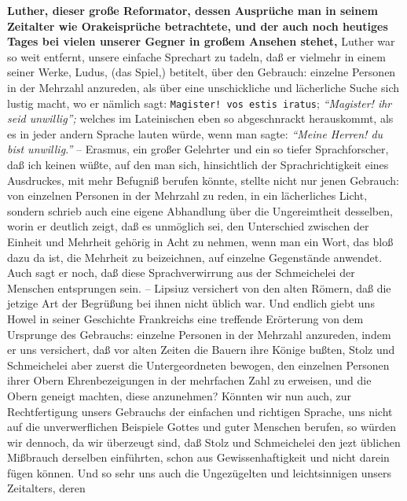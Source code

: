 \textbf{Luther, dieser große Reformator, dessen Ausprüche man in seinem Zeitalter
wie Orakeisprüche betrachtete, und der auch noch heutiges Tages bei vielen
unserer Gegner in großem Ansehen stehet,} Luther war so weit entfernt, unsere
einfache Sprechart zu tadeln, daß er vielmehr in einem seiner Werke, Ludus, (das
Spiel,) betitelt, über den Gebrauch: einzelne Personen in der Mehrzahl
anzureden, als über eine unschickliche und lächerliche Suche sich lustig macht,
wo er nämlich sagt: \texttt{Magister! vos estis iratus}; \textit{"`Magister! ihr seid
unwillig"';} welches im Lateinischen eben so abgeschnrackt herauskommt, als es in
jeder andern Sprache lauten würde, wenn man sagte:
\textit{"`Meine Herren! du bist unwillig."'} -- Erasmus, ein großer Gelehrter und ein so tiefer Sprachforscher,
daß ich keinen wüßte, auf den man sich, hinsichtlich der Sprachrichtigkeit eines
Ausdruckes, mit mehr Befugniß berufen könnte, stellte nicht nur jenen Gebrauch:
von einzelnen Personen in der Mehrzahl zu reden, in ein lächerliches Licht,
sondern schrieb auch eine eigene Abhandlung über die Ungereimtheit desselben,
worin er deutlich zeigt, daß es unmöglich sei, den Unterschied zwischen der
Einheit und Mehrheit gehörig in Acht zu nehmen, wenn man ein Wort, das bloß dazu
da ist, die Mehrheit zu beizeichnen, auf einzelne Gegenstände anwendet. Auch
sagt er noch, daß diese Sprachverwirrung aus der Schmeichelei der Menschen
entsprungen sein. -- Lipsiuz versichert von den alten Römern, daß die jetzige Art
der Begrüßung bei ihnen nicht üblich war. Und endlich giebt uns Howel in seiner
Geschichte Frankreichs eine treffende Erörterung von dem Ursprunge des
Gebrauchs: einzelne Personen in der Mehrzahl anzureden, indem er uns versichert,
daß vor alten Zeiten die Bauern ihre Könige bußten, Stolz und Schmeichelei aber
zuerst die Untergeordneten bewogen, den einzelnen Personen ihrer Obern
Ehrenbezeigungen in der mehrfachen Zahl zu erweisen, und die Obern geneigt
machten, diese anzunehmen? Könnten wir nun auch, zur Rechtfertigung unsers
Gebrauchs der einfachen und richtigen Sprache, uns nicht auf die unverwerflichen
Beispiele Gottes und guter Menschen berufen, so würden wir dennoch, da wir
überzeugt sind, daß Stolz und Schmeichelei den jezt üblichen Mißbrauch derselben
einführten, schon aus Gewissenhaftigkeit und nicht darein fügen können. Und so
sehr uns auch die Ungezügelten und leichtsinnigen unsers Zeitalters, deren
